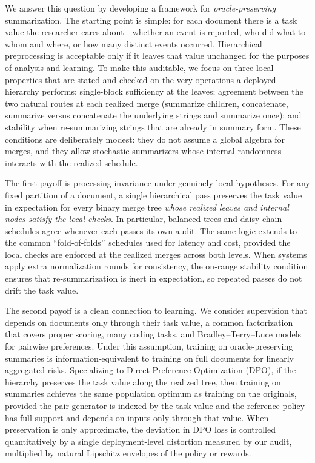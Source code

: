 \documentclass[11pt]{article}
\begin{document}
We answer this question by developing a framework for \emph{oracle-preserving} summarization. The starting point is simple: for each document there is a task value the researcher cares about—whether an event is reported, who did what to whom and where, or how many distinct events occurred. Hierarchical preprocessing is acceptable only if it leaves that value unchanged for the purposes of analysis and learning. To make this auditable, we focus on three local properties that are stated and checked on the very operations a deployed hierarchy performs: single-block sufficiency at the leaves; agreement between the two natural routes at each realized merge (summarize children, concatenate, summarize versus concatenate the underlying strings and summarize once); and stability when re‑summarizing strings that are already in summary form. These conditions are deliberately modest: they do not assume a global algebra for merges, and they allow stochastic summarizers whose internal randomness interacts with the realized schedule.

The first payoff is processing invariance under genuinely local hypotheses. For any fixed partition of a document, a single hierarchical pass preserves the task value in expectation for every binary merge tree \emph{whose realized leaves and internal nodes satisfy the local checks}. In particular, balanced trees and daisy‑chain schedules agree whenever each passes its own audit. The same logic extends to the common “fold‑of‑folds’’ schedules used for latency and cost, provided the local checks are enforced at the realized merges across both levels. When systems apply extra normalization rounds for consistency, the on‑range stability condition ensures that re‑summarization is inert in expectation, so repeated passes do not drift the task value.

The second payoff is a clean connection to learning. We consider supervision that depends on documents only through their task value, a common factorization that covers proper scoring, many coding tasks, and Bradley–Terry–Luce models for pairwise preferences. Under this assumption, training on oracle‑preserving summaries is information‑equivalent to training on full documents for linearly aggregated risks. Specializing to Direct Preference Optimization (DPO), if the hierarchy preserves the task value along the realized tree, then training on summaries achieves the same population optimum as training on the originals, provided the pair generator is indexed by the task value and the reference policy has full support and depends on inputs only through that value. When preservation is only approximate, the deviation in DPO loss is controlled quantitatively by a single deployment‑level distortion measured by our audit, multiplied by natural Lipschitz envelopes of the policy or rewards.
\end{document}
